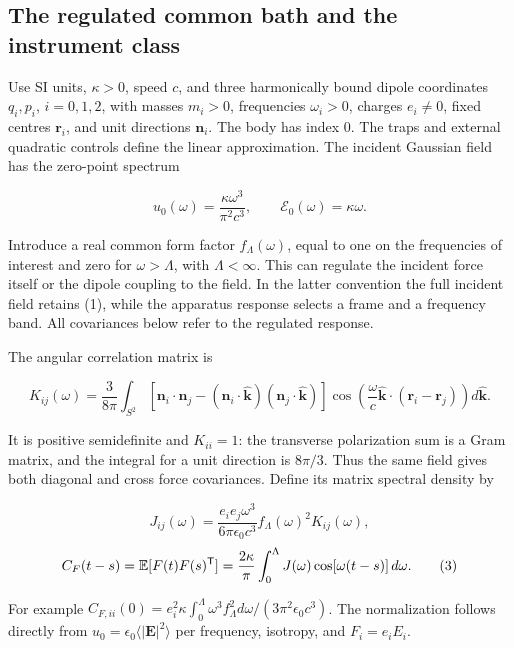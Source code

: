\documentclass[11pt,a4paper]{article}
\begin{document}
\hypertarget{the-regulated-common-bath-and-the-instrument-class}{%
\subsection{The regulated common bath and the instrument
class}\label{the-regulated-common-bath-and-the-instrument-class}}

Use SI units, \(\kappa>0\), speed \(c\), and three harmonically bound
dipole coordinates \(q_i,p_i\), \(i=0,1,2\), with masses \(m_i>0\),
frequencies \(\omega_i>0\), charges \(e_i\ne0\), fixed centres
\(\mathbf r_i\), and unit directions \(\mathbf n_i\). The body has index
\(0\). The traps and external quadratic controls define the linear
approximation. The incident Gaussian field has the zero-point spectrum

\[u_0(\omega)=\frac{\kappa\omega^3}{\pi^2c^3},\qquad
\mathcal E_0(\omega)=\kappa\omega. \tag{1}\]

Introduce a real common form factor \(f_\Lambda(\omega)\), equal to one
on the frequencies of interest and zero for \(\omega>\Lambda\), with
\(\Lambda<\infty\). This can regulate the incident force itself or the
dipole coupling to the field. In the latter convention the full incident
field retains (1), while the apparatus response selects a frame and a
frequency band. All covariances below refer to the regulated response.

The angular correlation matrix is

\[K_{ij}(\omega)=\frac{3}{8\pi}\int_{S^2}
\left[\mathbf n_i\!\cdot\!\mathbf n_j
 -(\mathbf n_i\!\cdot\!\widehat{\mathbf k})
  (\mathbf n_j\!\cdot\!\widehat{\mathbf k})\right]
\cos\!\left(\frac{\omega}{c}\widehat{\mathbf k}\!\cdot\!
 (\mathbf r_i-\mathbf r_j)\right)d\widehat{\mathbf k}. \tag{2}\]

It is positive semidefinite and \(K_{ii}=1\): the transverse
polarization sum is a Gram matrix, and the integral for a unit direction
is \(8\pi/3\). Thus the same field gives both diagonal and cross force
covariances. Define its matrix spectral density by

\[J_{ij}(\omega)=\frac{e_i e_j\omega^3}{6\pi\epsilon_0c^3}
 f_\Lambda(\omega)^2K_{ij}(\omega),\]
\[C_F(t-s)=\mathbb E[F(t)F(s)^{\sf T}]
 =\frac{2\kappa}{\pi}\int_0^\Lambda J(\omega)
       \cos[\omega(t-s)]\,d\omega. \tag{3}\]

For example
\(C_{F,ii}(0)=e_i^2\kappa\int_0^\Lambda \omega^3f_\Lambda^2d\omega/(3\pi^2\epsilon_0c^3)\).
The normalization follows directly from
\(u_0=\epsilon_0\langle |\mathbf E|^2\rangle\) per frequency, isotropy,
and \(F_i=e_i E_i\).
\end{document}
